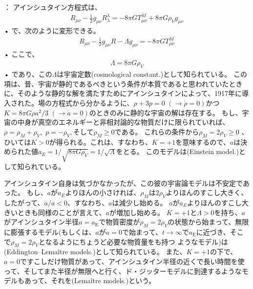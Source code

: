 \documentclass[11pt,a4paper,dvipdfmx]{jsarticle}
\theoremstyle{plain}
\theoremstyle{break}
\begin{document}
\noindent
{}：
アインシュタイン方程式は、
\begin{align}
  R_{\mu \nu}-\frac{1}{2} g_{\mu \nu} R_{\lambda}^{\lambda}=-8 \pi G T_{\mu \nu}^{M}+8 \pi G \rho_{V} g_{\mu \nu}
\end{align}•%
で、次のように変形できる。
\begin{align}
  R_{\mu \nu}-\frac{1}{2} g_{\mu \nu} R-\Lambda g_{\mu \nu}=-8 \pi G T_{\mu \nu}^{M}
\end{align}•%
ここで、
\begin{align}
  \Lambda=8 \pi G \rho_{V}
\end{align}•%
であり、この$\Lambda$は宇宙定数(cosmological constant.)として知られている。
この項は、昔、宇宙が静的であるべきという条件が本質であると思われていたときに、そのような静的な解を満たすためにアインシュタインによって、1917年に導入された。場の方程式から分かるように、$\rho + 3p = 0 \,\,(\to \dot{\rho} =0)$かつ$K= 8\pi G \rho a^2/3 \,\,(\to \dot{a}=0)$のときのみに静的な宇宙の解は存在する。
もし、宇宙の中身が真空のエネルギーと非相対論的な物質だけに限られていれば、$\rho = \rho_M + \rho_V , \,\, p = - \rho_{V},$そして$\rho_{M} \geq 0$である。
これらの条件から$\rho_{M} = 2 \rho_{V} \geq 0$ 、ひいては$K>0$が得られる。これは、すなわち、$K=+1$を意味するので、$a$は決められた値$a_{E}=1 / \sqrt{8 \pi G \rho_{V}}=1/\sqrt{\Lambda}$をとる。
このモデルは(Einstein model.)として知られている。

アインシュタイン自身は気づかなかったが、この彼の宇宙論モデルは不安定であった。
もし、$a$が$a_{E}$よりほんの小さければ、$\rho_{M}$は$2\rho_{V}$よりほんのすこし大きく、したがって、$\ddot{a}/a < 0$、すなわち、$a$は減少し始める。%
$a$が$a_{E}$よりほんのすこし大きいときも同様のことが言えて、$a$が増加し始める。
$K=+1$と$\Lambda > 0$を持ち、$a$がアインシュタイン半径$a = a_{\mathrm{E}}$で物質密度が$\rho_{M} = 2 \rho_{V}$の状態から始まって、無限に膨張するモデル(もしくは、$a$が$a=0$で始まって、$t \to \infty$で$a_{\mathrm{E}}$に近づき、そこで$\rho_M = 2 \rho_{V}$となるようにちょうど必要な物質量をも持つ
ようなモデル)は(Eddington–Lemaître models.)として知られている。
また、$K = +1$の下で、$a=0$ですこしだけ物質があって、アインシュタイン半径の近くで長い時間を使って、そしてまた半径が無限へと行く、ド・ジッターモデルに到達するようなモデルもあって、それを(Lemaître models.)という。
\end{document}

